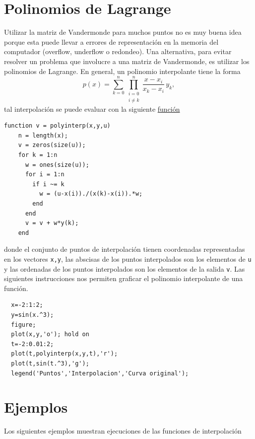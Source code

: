 \documentclass[letterpaper,11pt]{article}
\begin{document}
\section{Polinomios de Lagrange}


Utilizar la matriz de Vandermonde para muchos puntos no es muy buena idea porque esta puede llevar a errores de representaci\'on en la memoria del computador (overflow, underflow o redondeo). Una alternativa, para evitar resolver un problema que involucre a una matriz de Vandermonde, es utilizar los polinomios de Lagrange. En general, un polinomio interpolante tiene la forma
$$\displaystyle
p(x)=\sum_{k=0}^{n} \prod_{\substack{i=0\\i\neq k}}^n \frac{x-x_i}{x_k-x_i} \, y_k,
$$
tal interpolaci\'on se puede evaluar con la siguiente
\href{ftp://ftp.ing-mat.udec.cl/pub/ing-mat/asignaturas/521230/ejercicios/2018-1/polyinterp.m}{funci\'on}
\begin{lstlisting}
function v = polyinterp(x,y,u)
    n = length(x);
    v = zeros(size(u));
    for k = 1:n
      w = ones(size(u));
      for i = 1:n
        if i ~= k
          w = (u-x(i))./(x(k)-x(i)).*w;
        end
      end
      v = v + w*y(k);
    end
\end{lstlisting}
donde el conjunto de puntos de interpolaci\'on tienen coordenadas representadas en los vectores \texttt{x,y}, las abscisas de los puntos interpolados son los elementos de \texttt{u} y las ordenadas de los puntos interpolados son los elementos de la salida \texttt{v}. Las siguientes instrucciones nos permiten graficar el polinomio interpolante de una funci\'on.
\begin{lstlisting}
  x=-2:1:2;
  y=sin(x.^3);
  figure;
  plot(x,y,'o'); hold on
  t=-2:0.01:2;
  plot(t,polyinterp(x,y,t),'r');
  plot(t,sin(t.^3),'g');
  legend('Puntos','Interpolacion','Curva original');
\end{lstlisting}

\section{Ejemplos}

Los siguientes ejemplos muestran ejecuciones de las funciones de interpolaci\'on
\end{document}
